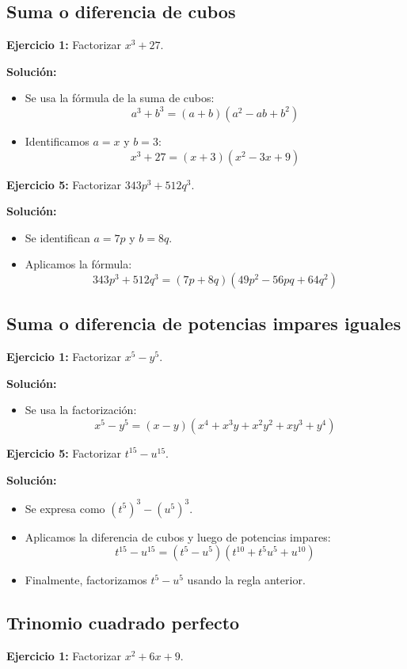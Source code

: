 \documentclass{profesor}
\begin{document}
\subsection{Suma o diferencia de cubos}
\textbf{Ejercicio 1:}  
Factorizar \( x^3 + 27 \).

\textbf{Solución:}
\begin{itemize}
    \item Se usa la fórmula de la suma de cubos:
    \[
    a^3 + b^3 = (a + b)(a^2 - ab + b^2)
    \]
    \item Identificamos \( a = x \) y \( b = 3 \):
    \[
    x^3 + 27 = (x + 3)(x^2 - 3x + 9)
    \]
\end{itemize}

\textbf{Ejercicio 5:}  
Factorizar \( 343p^3 + 512q^3 \).

\textbf{Solución:}
\begin{itemize}
    \item Se identifican \( a = 7p \) y \( b = 8q \).
    \item Aplicamos la fórmula:
    \[
    343p^3 + 512q^3 = (7p + 8q)(49p^2 - 56pq + 64q^2)
    \]
\end{itemize}

\subsection{Suma o diferencia de potencias impares iguales}
\textbf{Ejercicio 1:}  
Factorizar \( x^5 - y^5 \).

\textbf{Solución:}
\begin{itemize}
    \item Se usa la factorización:
    \[
    x^5 - y^5 = (x - y)(x^4 + x^3y + x^2y^2 + xy^3 + y^4)
    \]
\end{itemize}

\textbf{Ejercicio 5:}  
Factorizar \( t^{15} - u^{15} \).

\textbf{Solución:}
\begin{itemize}
    \item Se expresa como \( (t^5)^3 - (u^5)^3 \).
    \item Aplicamos la diferencia de cubos y luego de potencias impares:
    \[
    t^{15} - u^{15} = (t^5 - u^5)(t^{10} + t^5u^5 + u^{10})
    \]
    \item Finalmente, factorizamos \( t^5 - u^5 \) usando la regla anterior.
\end{itemize}

\subsection{Trinomio cuadrado perfecto}
\textbf{Ejercicio 1:}  
Factorizar \( x^2 + 6x + 9 \).
\end{document}
